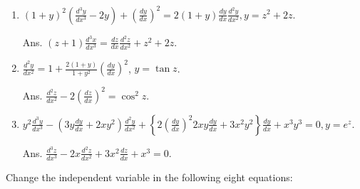 \begin{enumerate}
\addtocounter{enumi}{4}


\item
$(1 + y)^2 \left( \frac{d^3 y}{dx^3} - 2 y \right) 
+ \left( \frac{dy}{dx} \right)^2 
= 2 \left( 1 + y \right) \frac{dy}{dx} \frac{d^2 y}{dx^2}, y = z^2 + 2 z$.

Ans. 
$(z + 1) \frac{d^3 x}{dx^3} = \frac{dz}{dx} \frac{d^2 z}{dx^2} + z^2 + 2 z$.

\item
$\frac{d^2 y}{dx^2} 
= 1 + \frac{2 (1 + y)}{1 + y^2} \left( \frac{dy}{dx} \right)^2$, 
$y = \tan z$. 	

Ans. 	
$\frac{d^2 z}{dx^2} - 2 \left( \frac{dz}{dx} \right)^2 = \cos^2 z$.

\item
$y^2 \frac{d^3 y}{dx^3} - \left( 3 y \frac{dy}{dx} 
+ 2 x y^2 \right) \frac{d^2 y}{dx^2} 
+ \left\{ 2 \left( \frac{dy}{dx} \right)^2 2xy \frac{dy}{dx} 
+ 3x^2 y^2 \right\} \frac{dy}{dx} + x^3 y^3 = 0, y = e^z$.

Ans. 	
$\frac{d^3 z}{dx^3} - 2 x \frac{d^2 z}{dx^2} + 3 x^2 \frac{dz}{dx} + x^3 = 0$.

\end{enumerate}

Change the independent variable in the following eight equations:

